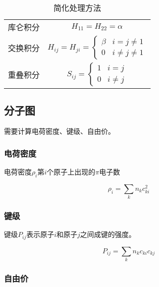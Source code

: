 \begin{table}[h]
    \centering
    \begin{tabular}{cc}
        库仑积分 & $H_{11} = H_{22} = \alpha$                 \\
        交换积分 & $H_{ij} = H_{ji} = \begin{cases}
                                              \beta & i = j \neq 1    \\
                                              0     & i \neq j \neq 1
                                          \end{cases}$ \\
        重叠积分 & $S_{ij} = \begin{cases}
                                     1 & i = j    \\
                                     0 & i \neq j
                                 \end{cases}$
    \end{tabular}
    \caption{简化处理方法}
    \label{tab:simplify}
\end{table}


\subsection{分子图}

需要计算电荷密度、键级、自由价。

\subsubsection{电荷密度}

电荷密度$\rho_i$第$i$个原子上出现的$\pi$电子数

\begin{equation*}
    \rho_i = \sum_{k} n_k c^2_{ki}
\end{equation*}

\subsubsection{键级}

键级$P_{ij}$表示原子$i$和原子$j$之间成键的强度。

\begin{equation*}
    P_{ij} = \sum_k n_k c_{ki} c_{kj}
\end{equation*}

\subsubsection{自由价}

